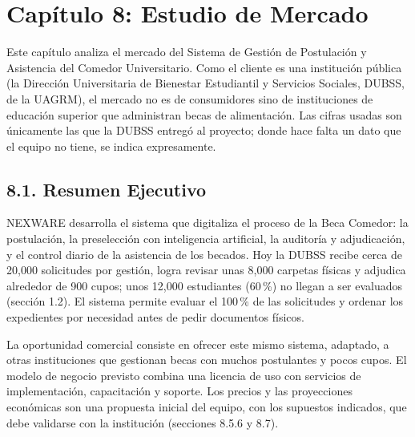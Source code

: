 
\newpage
\section{Capítulo 8: Estudio de Mercado}\label{cap:mercado}


Este capítulo analiza el mercado del Sistema de Gestión de Postulación y Asistencia del Comedor Universitario. Como el cliente es una institución pública (la Dirección Universitaria de Bienestar Estudiantil y Servicios Sociales, DUBSS, de la UAGRM), el mercado no es de consumidores sino de instituciones de educación superior que administran becas de alimentación. Las cifras usadas son únicamente las que la DUBSS entregó al proyecto; donde hace falta un dato que el equipo no tiene, se indica expresamente.

\subsection{8.1. Resumen Ejecutivo}

NEXWARE desarrolla el sistema que digitaliza el proceso de la Beca Comedor: la postulación, la preselección con inteligencia artificial, la auditoría y adjudicación, y el control diario de la asistencia de los becados. Hoy la DUBSS recibe cerca de 20,000 solicitudes por gestión, logra revisar unas 8,000 carpetas físicas y adjudica alrededor de 900 cupos; unos 12,000 estudiantes (60\,\%) no llegan a ser evaluados (sección 1.2). El sistema permite evaluar el 100\,\% de las solicitudes y ordenar los expedientes por necesidad antes de pedir documentos físicos.

La oportunidad comercial consiste en ofrecer este mismo sistema, adaptado, a otras instituciones que gestionan becas con muchos postulantes y pocos cupos. El modelo de negocio previsto combina una licencia de uso con servicios de implementación, capacitación y soporte. Los precios y las proyecciones económicas son una propuesta inicial del equipo, con los supuestos indicados, que debe validarse con la institución (secciones 8.5.6 y 8.7).

